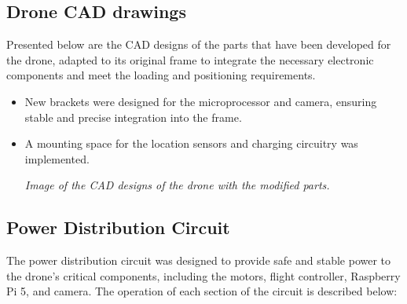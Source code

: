 \subsection{Drone CAD drawings} 
Presented below are the CAD designs of the parts that have been developed for the drone, adapted to its original frame to integrate the necessary electronic components and meet the loading and positioning requirements.
    \begin{itemize} 
        \item New brackets were designed for the microprocessor and camera, ensuring stable and precise integration into the frame. 
        \item A mounting space for the location sensors and charging circuitry was implemented. 
        \begin{center} 
            \textit{Image of the CAD designs of the drone with the modified parts.} 
        \end{center} 
    \end{itemize}

    \subsection{Power Distribution Circuit} 
    The power distribution circuit was designed to provide safe and stable power to the drone's critical components, including the motors, flight controller, Raspberry Pi 5, and camera. The operation of each section of the circuit is described below:
    
